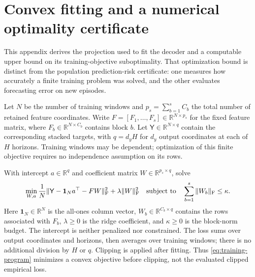\section{Convex fitting and a numerical optimality certificate}
\label{app:optimization}

This appendix derives the projection used to fit the decoder and a computable
upper bound on its training-objective suboptimality. That optimization bound
is distinct from the population prediction-risk certificate: one measures
how accurately a finite training problem was solved, and the other evaluates
forecasting error on new episodes.

Let $N$ be the number of training windows and
$p_s=\sum_{b=1}^sC_b$ the total number of retained feature coordinates. Write
$F=[F_1,\ldots,F_s]\in\mathbb R^{N\times p_s}$ for the fixed feature
matrix, where $F_b\in\mathbb R^{N\times C_b}$ contains block $b$.
Let $\mathsf Y\in\mathbb R^{N\times q}$ contain the corresponding
stacked targets, with $q=d_yH$ for $d_y$ output coordinates at each of
$H$ horizons. Training windows may be dependent; optimization of this
finite objective requires no independence assumption on its rows.

With intercept $a\in\mathbb R^q$ and coefficient matrix
$W\in\mathbb R^{p_s\times q}$, solve
\begin{equation}
 \min_{W,a}\frac1N\|\mathsf Y-\mathbf1_Na^\top-FW\|_{\rm F}^2
                       +\lambda\|W\|_{\rm F}^2
 \quad\text{subject to}\quad
       \sum_{b=1}^s\|W_b\|_{\rm F}\leq\kappa.
 \label{eq:training-program}
\end{equation}
Here $\mathbf1_N\in\mathbb R^N$ is the all-ones column vector,
$W_b\in\mathbb R^{C_b\times q}$ contains the rows associated with
$F_b$, $\lambda\geq0$ is the ridge coefficient, and $\kappa\geq0$ is
the block-norm budget. The intercept is neither penalized nor constrained.
The loss sums over output coordinates and horizons, then averages over
training windows; there is no additional division by $H$ or $q$.
Clipping is applied after fitting. Thus \eqref{eq:training-program}
minimizes a convex objective before clipping, not the evaluated clipped
empirical loss.

